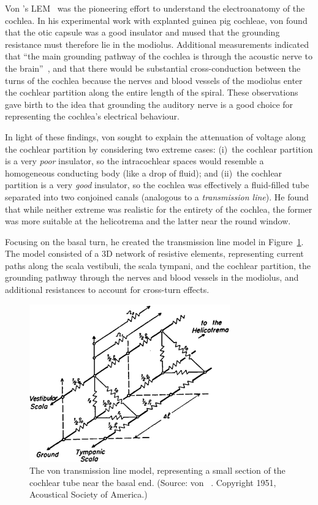 Von \bekesy's LEM~\cite{vonbekesy1951} was the pioneering effort to understand
the electroanatomy of the cochlea. In his experimental work with explanted
guinea pig cochleae, von \bekesy{} found that the otic capsule was a good
insulator and mused that the grounding resistance must therefore lie in the
modiolus. Additional measurements indicated that ``the main grounding pathway of
the cochlea is through the acoustic nerve to the brain''~\cite{vonbekesy1951},
and that there would be substantial cross-conduction between the turns of the
cochlea because the nerves and blood vessels of the modiolus enter the cochlear
partition along the entire length of the spiral. These observations gave birth
to the idea that grounding the auditory nerve is a good choice for representing
the cochlea's electrical behaviour.

In light of these findings, von \bekesy{} sought to explain the attenuation
of voltage along the cochlear partition by considering two extreme cases:
(i)~the cochlear partition is a very \emph{poor} insulator, so the intracochlear
spaces would resemble a homogeneous conducting body (like a drop of fluid); and
(ii)~the cochlear partition is a very \emph{good} insulator, so the cochlea was
effectively a fluid-filled tube separated into two conjoined canals (analogous
to a \emph{transmission line}). He found that while neither extreme was
realistic for the entirety of the cochlea, the former was more suitable at the
helicotrema and the latter near the round window.

Focusing on the basal turn, he created the transmission line model in
Figure~\ref{fig:model_vonbekesy}. The model consisted of a 3D network of
resistive elements, representing current paths along the scala vestibuli, the
scala tympani, and the cochlear partition, the grounding pathway through the
nerves and blood vessels in the modiolus, and additional resistances to account
for cross-turn effects.

\begin{figure}
	\centering
	\includegraphics[height=6.8cm]{Background/vonbekesy_fig11a}
	\caption[The von \bekesy{} model]{The von \bekesy{} transmission line model,
	representing a small section of the cochlear tube near the basal end. (Source:
	von \bekesy~\cite{vonbekesy1951}. Copyright \textcopyright{} 1951,
	Acoustical Society of America.)}
	\label{fig:model_vonbekesy}
\end{figure}

